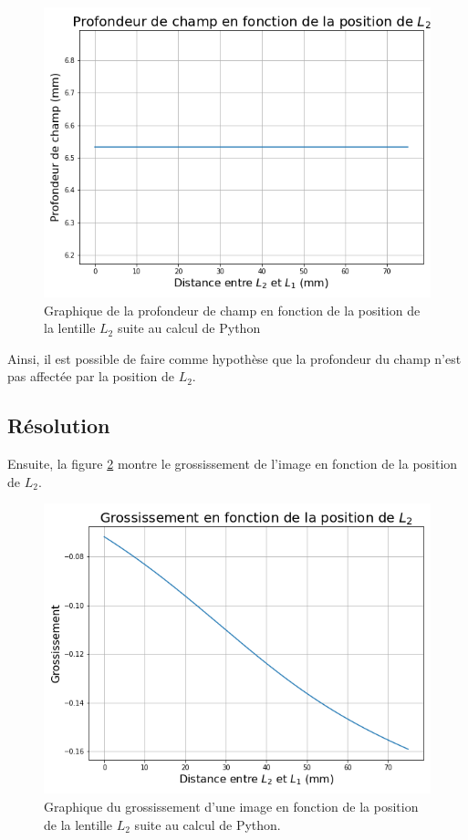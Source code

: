\documentclass[11pt,letterpaper]{article}
\begin{document}
\begin{figure}[H]
  \centering
  \includegraphics[scale=0.55]{prof_champ.png}
  \caption{Graphique de la profondeur de champ en fonction de la position de la lentille 
  $L_2$ suite au calcul de Python}
  \label{prof_champ_plot}
\end{figure}

Ainsi, il est possible de faire comme hypothèse que la profondeur du champ n'est pas affectée
par la position de $L_2$.

\subsection{Résolution}

Ensuite, la figure \ref{gross_plot} montre le grossissement de l'image en fonction de la
position de $L_2$.

\begin{figure}[H]
  \centering
  \includegraphics[scale=0.55]{grossissement.png}
  \caption{Graphique du grossissement d'une image en fonction de la position de la lentille
  $L_2$ suite au calcul de Python.}
  \label{gross_plot}
\end{figure}
\end{document}
